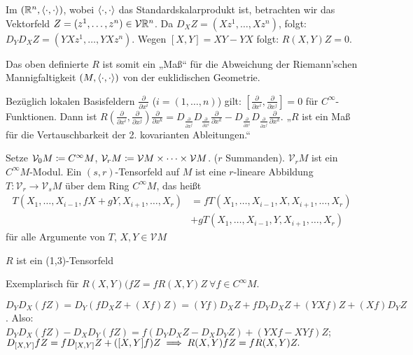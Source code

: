 \documentclass[a4paper,twoside,DIV15,BCOR12mm]{scrbook}
\newcommand{\V}{\mathcal V}
\begin{document}
\begin{beispiel}
Im $(\mathbb{R}^n,\langle\cdot,\cdot\rangle)$, wobei $\langle\cdot,\cdot\rangle$ das Standardskalarprodukt ist, betrachten wir das Vektorfeld $Z=(z^1,\ldots,z^n)\in \V \MdR^n$. Da $D_XZ = (Xz^1,\ldots,Xz^n)$, folgt: $D_YD_XZ = (YXz^1,\ldots,YXz^n)$. Wegen $[X,Y] = XY-YX$ folgt: $R(X,Y)Z = 0$.
\end{beispiel}

Das oben definierte $R$ ist somit ein „Maß“ für die Abweichung der Riemann’schen Mannigfaltigkeit $(M,\langle\cdot,\cdot\rangle)$ von der euklidischen Geometrie.

\begin{bemerkung}
Bezüglich lokalen Basisfeldern $\frac{\partial}{\partial x^i}$ ($i=(1,\ldots,n)$) gilt: $[\frac\partial{\partial x^i},\frac\partial{\partial x^j}] = 0$ für $C^\infty$-Funktionen. Dann ist $R(\frac\partial{\partial x^i},\frac\partial{\partial x^j})\frac\partial{\partial x^k} = D_{\frac\partial{\partial x^j}}D_{\frac\partial{\partial x^i}} \frac\partial{\partial x^k} - D_{\frac\partial{\partial x^i}}D_{\frac\partial{\partial x^j}} \frac\partial{\partial x^k} $. „$R$ ist ein Maß für die Vertauschbarkeit der 2. kovarianten Ableitungen.“
\end{bemerkung}

\begin{definition}
Setze $\V_0M \da C^\infty M$, $\V_rM \da \V M\times \cdots \times \V M$. ($r$ Summanden). $\V_rM$ ist ein $C^\infty M$-Modul. Ein $(s,r)$-Tensorfeld auf $M$ ist eine $r$-lineare Abbildung $T:\V_r \to \V_sM$ über dem Ring $C^\infty M$, das heißt 
\begin{align*}
T(X_1,\ldots,X_{i-1},fX + gY,X_{i+1},\ldots, X_r) &=
f T(X_1,\ldots,X_{i-1},X,X_{i+1},\ldots, X_r)\\ &+
g T(X_1,\ldots,X_{i-1},Y,X_{i+1},\ldots, X_r) 
\end{align*}
für alle Argumente von $T$, $X,Y \in \V M$
\end{definition}

\begin{satz}
\label{tensorfeld}
$R$ ist ein (1,3)-Tensorfeld
\end{satz}
\begin{beweis}
Exemplarisch für $R(X,Y)(fZ = fR(X,Y)Z\ \forall f\in C^\infty M$.

$D_YD_X(fZ) = D_Y(fD_XZ + (Xf)Z) = (Yf)D_XZ + fD_YD_X Z + (YXf) Z + (Xf)D_YZ$. Also:
$D_YD_X(fZ) - D_XD_Y(fZ) = f(D_YD_XZ - D_XD_YZ) + (YXf - XYf)Z$; $D_{[X,Y]}fZ = fD_{[X,Y]}Z + ([X,Y]f)Z\implies R(X,Y)fZ = fR(X,Y)Z.$
\end{beweis}
\end{document}

